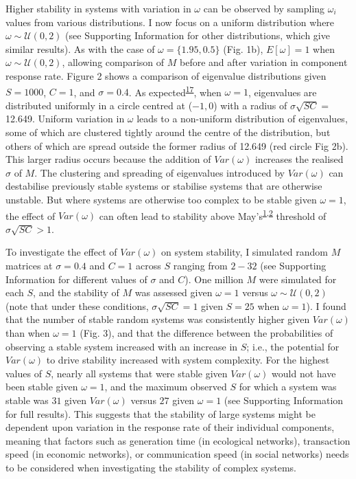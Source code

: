 \documentclass[]{article}
\begin{document}
Higher stability in systems with variation in \(\omega\) can be observed
by sampling \(\omega_{i}\) values from various distributions. I now
focus on a uniform distribution where \(\omega \sim \mathcal{U}(0, 2)\)
(see Supporting Information for other distributions, which give similar
results). As with the case of \(\omega = \{1.95, 0.5\}\) (Fig. 1b),
\(E[\omega] = 1\) when \(\omega \sim \mathcal{U}(0, 2)\), allowing
comparison of \(M\) before and after variation in component response
rate. Figure 2 shows a comparison of eigenvalue distributions given
\(S = 1000\), \(C = 1\), and \(\sigma = 0.4\). As
expected\textsuperscript{\protect\hyperlink{ref-Tao2010}{17}}, when
\(\omega = 1\), eigenvalues are distributed uniformly in a circle
centred at (\(-1, 0\)) with a radius of \(\sigma\sqrt{SC} =\) 12.649.
Uniform variation in \(\omega\) leads to a non-uniform distribution of
eigenvalues, some of which are clustered tightly around the centre of
the distribution, but others of which are spread outside the former
radius of 12.649 (red circle Fig 2b). This larger radius occurs because
the addition of \(Var(\omega)\) increases the realised \(\sigma\) of
\(M\). The clustering and spreading of eigenvalues introduced by
\(Var(\omega)\) can destabilise previously stable systems or stabilise
systems that are otherwise unstable. But where systems are otherwise too
complex to be stable given \(\omega = 1\), the effect of \(Var(\omega)\)
can often lead to stability above
May's\textsuperscript{\protect\hyperlink{ref-May1972}{1},\protect\hyperlink{ref-Allesina2012}{2}}
threshold of \(\sigma\sqrt{SC} > 1\).

To investigate the effect of \(Var(\omega)\) on system stability, I
simulated random \(M\) matrices at \(\sigma = 0.4\) and \(C = 1\) across
\(S\) ranging from \(2-32\) (see Supporting Information for different
values of \(\sigma\) and \(C\)). One million \(M\) were simulated for
each \(S\), and the stability of \(M\) was assessed given \(\omega = 1\)
versus \(\omega \sim \mathcal{U}(0, 2)\) (note that under these
conditions, \(\sigma\sqrt{SC} = 1\) given \(S = 25\) when
\(\omega = 1\)). I found that the number of stable random systems was
consistently higher given \(Var(\omega)\) than when \(\omega = 1\) (Fig.
3), and that the difference between the probabilities of observing a
stable system increased with an increase in \(S\); i.e., the potential
for \(Var(\omega)\) to drive stability increased with system complexity.
For the highest values of \(S\), nearly all systems that were stable
given \(Var(\omega)\) would not have been stable given \(\omega = 1\),
and the maximum observed \(S\) for which a system was stable was \(31\)
given \(Var(\omega)\) versus \(27\) given \(\omega = 1\) (see Supporting
Information for full results). This suggests that the stability of large
systems might be dependent upon variation in the response rate of their
individual components, meaning that factors such as generation time (in
ecological networks), transaction speed (in economic networks), or
communication speed (in social networks) needs to be considered when
investigating the stability of complex systems.
\end{document}
